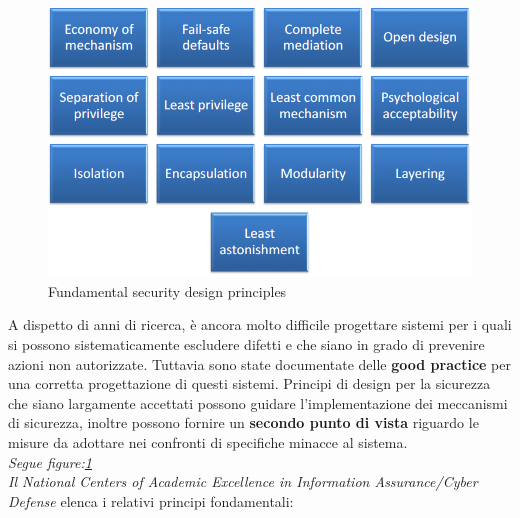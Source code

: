\documentclass[12pt]{article}
\begin{document}
		\begin{figure}[h!]
			\centering
			\includegraphics[scale=0.40]{img/desprinc.PNG}
			\caption{Fundamental security design principles\label{fig:6}}
		\end{figure}
			A dispetto di anni di ricerca, è ancora molto difficile progettare sistemi per i quali si possono sistematicamente escludere difetti e che siano in grado di prevenire azioni non autorizzate. Tuttavia sono state documentate delle \textbf{good practice} per una corretta progettazione di questi sistemi. Principi di design per la sicurezza che siano largamente accettati possono guidare l'implementazione dei meccanismi di sicurezza, inoltre possono fornire un \textbf{secondo punto di vista} riguardo le misure da adottare nei confronti di specifiche minacce al sistema.  \\
			\textit{Segue figure:\ref{fig:6}} \\
			\textit{Il National Centers of Academic Excellence in Information Assurance/Cyber Defense} elenca i relativi principi fondamentali: \\
\end{document}
